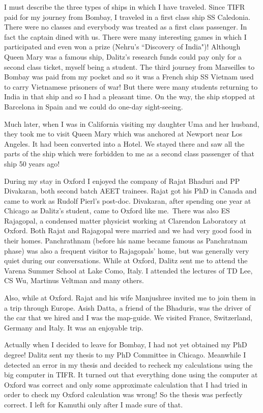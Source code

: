 I must describe the three types of ships in which I have trave\-led. 
Since TIFR paid for my journey from Bombay, I traveled in a first class 
ship SS Caledonia. There were no classes and everybody was treated as a 
first class passenger. In fact the captain dined with us. There were many 
interesting games in which I participated and even won a prize (Nehru's 
``Discovery of India")! Although Queen Mary was a famous ship, Dalitz's 
research funds could pay only for a second class ticket, myself being a 
student. The third journey from Marseilles to Bombay was paid from my 
pocket and so it was a French ship SS Vietnam used to carry Vietnamese 
prisoners of war! But there were many students returning to India in 
that ship and so I had a pleasant time. On the way, the ship stopped at 
Barcelona in Spain and we could do one-day sight-seeing.

Much later, when I was in California visiting my daughter Uma and her 
husband, they took me to visit Queen Mary which was anchored at Newport 
near Los Angeles. It had been converted into a Hotel. We stayed there 
and saw all the parts of the ship which were forbidden to me as a second 
class passenger of that ship 50 years ago!

During my stay in Oxford I enjoyed the company of Rajat Bhaduri and PP 
Divakaran, both second batch AEET trainees. Rajat got his PhD in Canada 
and came to work as Rudolf Pierl's post-doc. Divakaran, after spending 
one year at Chicago as Dalitz's student, came to Oxford like me.\ There 
was also ES Rajago\-pal, a condensed matter physicist working at Clarendon 
Laboratory at Oxford. Both Rajat and Rajagopal were married and we had 
very good food in their homes. Panchrathnam (before his name became 
famous as Panchratnam phase) was also a frequent visi\-tor to Rajagopals' 
home, but was generally very quiet during our conversations.
\vskip 1pt
While at Oxford, Dalitz sent me to attend the Varena Summer School at 
Lake Como, Italy. I attended the lectures of TD Lee, CS Wu, Martinus 
Veltman and many others.

Also, while at Oxford. Rajat and his wife Manjushree invited me to join 
them in a trip through Europe. Asish Datta, a friend of the Bhaduris, 
was the driver of the car that we hired and I was the map-guide. We 
visited France, Switzerland, Germany and Italy. It was an enjoyable 
trip.
 
Actually when I decided to leave for Bombay, I had not yet obtained my 
PhD degree! Dalitz sent my thesis to my PhD Committee in Chicago. 
Meanwhile I detected an error in my thesis and decided to recheck my 
calculations using the big computer in TIFR. It turned out that 
everything done using the computer at Oxford was correct and only some 
approximate calculation that I had tried in order to check my Oxford 
calculation was wrong! So the thesis was perfectly correct. I left for 
Kamuthi only after I made sure of that.

